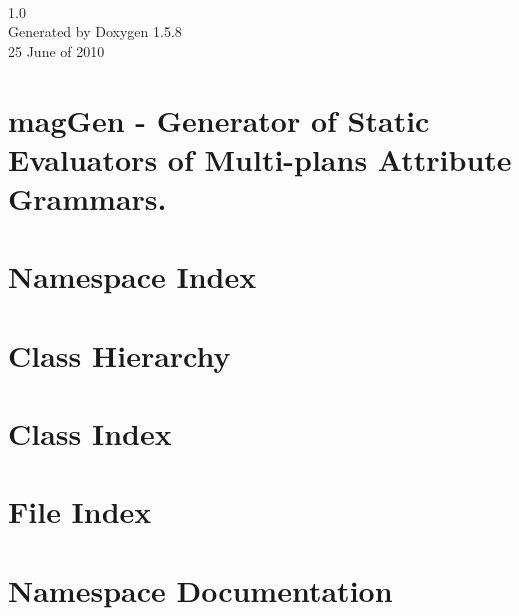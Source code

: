 \documentclass[a4paper,10pt]{book}
\begin{document}
\begin{titlepage}
\vspace*{7cm}
\begin{center}
{\fontsize{5em}{5em}\selectfont\textbf{\textit{}} \\[1ex]\large 1.0 }\\
\vspace*{1cm}
{\large Generated by Doxygen 1.5.8}\\
\vspace*{0.5cm}
{\small{25 June of 2010}}

\end{center}
\end{titlepage}
\clearemptydoublepage
{}
\tableofcontents
\clearemptydoublepage
{}
\chapter{magGen - Generator of Static Evaluators of Multi-plans Attribute Grammars.}
\label{index}\hypertarget{index}{}
\chapter{Namespace Index}

\chapter{Class Hierarchy}

\chapter{Class Index}

\chapter{File Index}

\chapter{Namespace Documentation}


\end{document}
